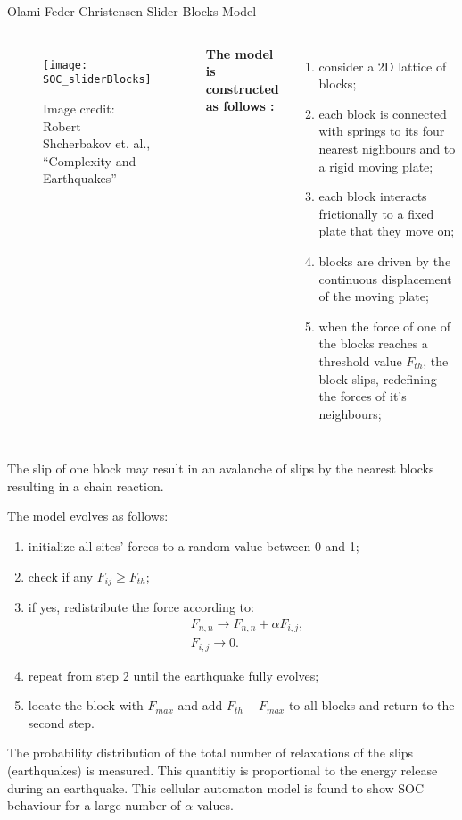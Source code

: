\begin{frame}{Olami-Feder-Christensen Slider-Blocks Model}

\begin{columns}
          	\begin{figure}[!h]
             \centering
             \texttt{[image: SOC\_sliderBlocks]}
             \caption{\tiny{Image credit: Robert Shcherbakov et. al., “Complexity and
Earthquakes”}}
			\end{figure}
              \textbf{The model is constructed as follows :}
               \begin{enumerate}
	\item consider a 2D lattice of blocks;
	\item each block is connected with springs to its four nearest nighbours and to a rigid moving plate;
	\item each block interacts frictionally to a fixed plate that they move on;
	\item blocks are driven by the continuous displacement of the moving plate;
	\item when the force of one of the blocks reaches a threshold value $F_{th}$, the block slips, redefining the forces of it's neighbours;
	
				\end{enumerate}

         \end{columns} 

\vspace{5mm} 

	The slip of one block may result in an avalanche of slips by the nearest blocks resulting in a chain reaction.
\end{frame}


\begin{frame}
The model evolves as follows:
\begin{enumerate}
	\item initialize all sites' forces to a random value between 0 and 1;
	\item check if any $F_{ij} \geq F_{th}$;
	\item if yes, redistribute the force according to:
	\begin{align}
	&F_{n,n} \to F_{n,n} + \alpha F_{i,j},\\
	&F_{i,j} \to 0.
	\end{align}
	\item repeat from step 2 until the earthquake fully evolves;
	\item locate the block with $F_{max}$ and add $F_{th}-F_{max}$ to all blocks and return to the second step.
\end{enumerate}
The probability distribution of the total number of relaxations of the slips (earthquakes) is measured. This quantitiy is proportional to the energy release during an earthquake. This cellular automaton model is found to show SOC behaviour for a large number of $\alpha$ values.\par 
\end{frame}


